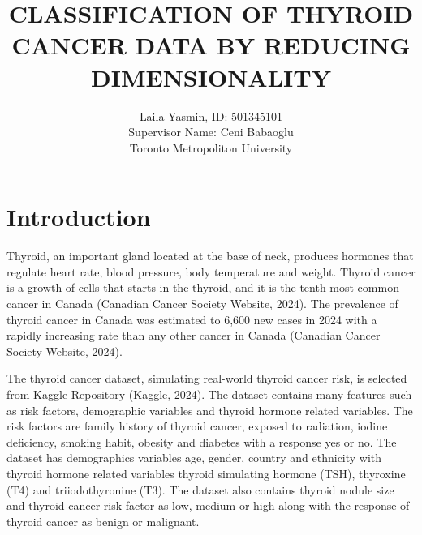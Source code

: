 \documentclass[11pt,a4paper]{article}
\title{CLASSIFICATION OF THYROID CANCER DATA BY REDUCING DIMENSIONALITY}
\author{Laila Yasmin, ID: 501345101 \\Supervisor Name: Ceni Babaoglu\\Toronto Metropoliton University}
\begin{document}
\maketitle

%

\section{Introduction} \label{intro}
Thyroid, an important gland located at the base of neck, produces hormones that regulate heart rate, blood pressure, body temperature and weight. Thyroid cancer is a growth of cells that starts in the thyroid, and it is the tenth most common cancer in Canada (Canadian Cancer Society Website, 2024). The prevalence of thyroid cancer in Canada was estimated to 6,600 new cases in 2024 with a rapidly increasing rate than any other cancer in Canada (Canadian Cancer Society Website, 2024).

The thyroid cancer dataset, simulating real-world thyroid cancer risk, is selected from Kaggle Repository (Kaggle, 2024). The dataset contains many features such as risk factors, demographic variables and thyroid hormone related variables. The risk factors are family history of thyroid cancer, exposed to radiation, iodine deficiency, smoking habit, obesity and diabetes with a response yes or no. The dataset has demographics variables age, gender, country and ethnicity with thyroid hormone related variables thyroid simulating hormone (TSH), thyroxine (T4) and triiodothyronine (T3). The dataset also contains thyroid nodule size and thyroid cancer risk factor as low, medium or high along with the response of thyroid cancer as benign or malignant.
\end{document}
